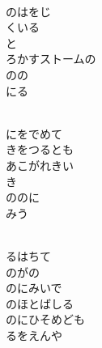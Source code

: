 \documentclass[10pt,b5j]{tarticle} %
\begin{document}
\begin{enumerate}
\begin{minipage}[c]{\blocksize}
    \end{minipage}
    \begin{minipage}[c]{\blocksize}
        
        \vspace{\linespace}
        \item~\\
        のはをじ\\
        くいる\\
        と\\
        ろかすストームの\\
        のの\\
        にる
        
    \end{minipage}
    \begin{minipage}[c]{\blocksize}
        
        \vspace{\linespace}
        \item~\\
        にをでめて\\
        きをつるとも\\
        あこがれきい\\
        き\\
        ののに\\
        みう
        
    \end{minipage}
    \begin{minipage}[c]{\blocksize}
        
        \vspace{\linespace}
        \item~\\
        るはちて\\
        のがの\\
        のにみいで\\
        のほとばしる\\
        のにひそめども\\
        るをえんや
    
    \end{minipage}
\end{enumerate} %
\end{document}
